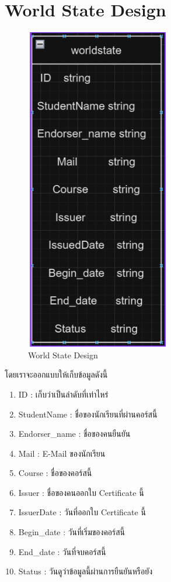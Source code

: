 
\section{World State Design}
\enskip \enskip \enskip \enskip \enskip
\graphicspath{ {./images/} }
\begin{figure}[htbp]
  \centering 
  \includegraphics[scale=0.7]{world.png}
  \caption[World State Design]{World State Design}
  \label{fig:World State Design}
\end{figure}
โดยเราจะออกแบบให้เก็บข้อมูลดังนี้
\enskip \enskip \enskip \enskip \enskip
\begin{enumerate}
  \item ID : เก็บว่าเป็นลำดับที่เท่าไหร่
  \item StudentName : ชื่อของนักเรียนที่ผ่านคอร์สนี้
  \item Endorser\_name : ชื่อของคนยืนยัน
  \item Mail : E-Mail ของนักเรียน
  \item Course : ชื่อของคอร์สนี้
  \item Issuer : ชื่อของคนออกใบ Certificate นี้
  \item IssuerDate : วันที่ออกใบ Certificate นี้
  \item Begin\_date : วันที่เริ่มของคอร์สนี้
  \item End\_date : วันที่จบคอร์สนี้
  \item Status : วันดูว่าข้อมูลนี้ผ่านการยืนยันหรือยัง
\end{enumerate}

